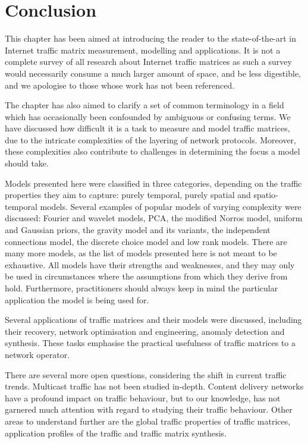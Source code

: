 
\clearpage
\section{Conclusion}
\label{sec:conclusion}

This chapter has been aimed at introducing the reader to the
state-of-the-art in Internet traffic matrix measurement, modelling and
applications. It is not a complete survey of all research about
Internet traffic matrices as such a survey would necessarily
consume a much larger amount of space, and be less digestible, and we
apologise to those whose work has not been referenced. 

The chapter has also aimed to clarify a set of common terminology in a
field which has occasionally been confounded by ambiguous or confusing
terms. We have discussed how difficult it is a task to measure and model traffic matrices,
due to the intricate complexities of the layering of network protocols. Moreover, these 
complexities also contribute to challenges in determining the focus a model should take. 

Models presented here were classified in three categories, depending on the traffic properties they
aim to capture: purely temporal, purely spatial and
spatio-temporal models. Several examples of popular models 
of varying complexity were discussed: Fourier and wavelet models, PCA, the modified Norros
model, uniform and Gaussian priors, the gravity model and its variants, the independent connections model,
the discrete choice model and low rank models. There are  
many more models, as the list of models presented here is not meant to 
be exhaustive. All models have their strengths and weaknesses, and they may only be
used in circumstances where the assumptions from which they derive from hold. Furthermore,
practitioners should always keep in mind the particular application the model is being used for.

Several applications of traffic matrices and their models were discussed, 
including their recovery, network optimisation and engineering, anomaly detection 
and synthesis. These tasks emphasise the practical usefulness of traffic matrices 
to a network operator. 

There are several more open questions, considering the shift in current traffic
trends. Multicast traffic has not been studied in-depth. Content delivery networks
have a profound impact on traffic behaviour, but to our knowledge, has not garnered much
attention with regard to studying their traffic behaviour. Other areas to understand
further are the global traffic properties of traffic matrices, application profiles of the
traffic and traffic matrix synthesis. 

